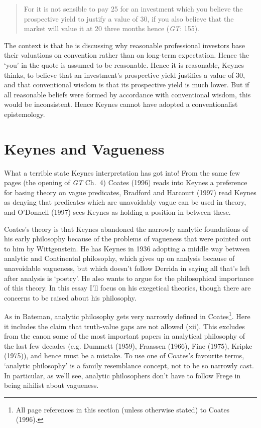 \documentclass[noflushend]{philosophersimprint}
\begin{document}
\begin{quote}
For it is not sensible to pay 25 for an investment which you believe the
prospective yield to justify a value of 30, if you also believe that the
market will value it at 20 three months hence (\emph{GT}: 155).
\end{quote}

The context is that he is discussing why reasonable professional
investors base their valuations on convention rather than on long-term
expectation. Hence the `you' in the quote is assumed to be reasonable.
Hence it is reasonable, Keynes thinks, to believe that an investment's
prospective yield justifies a value of 30, and that conventional wisdom
is that its prospective yield is much lower. But if all reasonable
beliefs were formed by accordance with conventional wisdom, this would
be inconsistent. Hence Keynes cannot have adopted a conventionalist
epistemology.

\hypertarget{keynes-and-vagueness}{%
\section{Keynes and Vagueness}\label{keynes-and-vagueness}}

What a terrible state Keynes interpretation has got into! From the same
few pages (the opening of \emph{GT} Ch.~4) Coates (1996) reads into
Keynes a preference for basing theory on vague predicates, Bradford and
Harcourt (1997) read Keynes as denying that predicates which are
unavoidably vague can be used in theory, and O'Donnell (1997) sees
Keynes as holding a position in between these.

Coates's theory is that Keynes abandoned the narrowly analytic
foundations of his early philosophy because of the problems of vagueness
that were pointed out to him by Wittgenstein. He has Keynes in 1936
adopting a middle way between analytic and Continental philosophy, which
gives up on analysis because of unavoidable vagueness, but which doesn't
follow Derrida in saying all that's left after analysis is `poetry'. He
also wants to argue for the philosophical importance of this theory. In
this essay I'll focus on his exegetical theories, though there are
concerns to be raised about his philosophy.

As in Bateman, analytic philosophy gets very narrowly defined in
Coates\footnote{All page references in this section (unless otherwise
  stated) to Coates (1996).}. Here it includes the claim that
truth-value gaps are not allowed (xii). This excludes from the canon
some of the most important papers in analytical philosophy of the last
few decades (e.g. Dummett (1959), Fraassen (1966), Fine (1975), Kripke
(1975)), and hence must be a mistake. To use one of Coates's favourite
terms, `analytic philosophy' is a family resemblance concept, not to be
so narrowly cast. In particular, as we'll see, analytic philosophers
don't have to follow Frege in being nihilist about vagueness.
\end{document}

